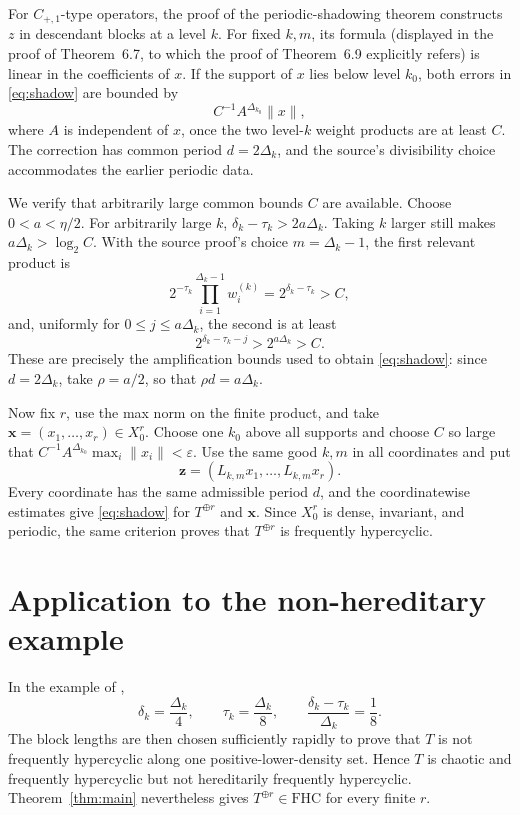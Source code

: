 \documentclass[11pt]{article}
\newcommand{\FHC}{\mathrm{FHC}}
\begin{document}
For \(C_{+,1}\)-type operators, the proof of the periodic-shadowing theorem
constructs \(z\) in descendant blocks at a level \(k\).  For fixed \(k,m\),
its formula (displayed in the proof of Theorem~6.7, to which the proof of
Theorem~6.9 explicitly refers) is linear in the coefficients of \(x\).  If
the support of \(x\)
lies below level \(k_0\), both errors in \eqref{eq:shadow} are bounded by
\[
 C^{-1}A^{\Delta_{k_0}}\|x\|,
\]
where \(A\) is independent of \(x\), once the two level-\(k\) weight products
are at least \(C\).  The correction has common period \(d=2\Delta_k\), and
the source's divisibility choice accommodates the earlier periodic data.

We verify that arbitrarily large common bounds \(C\) are available.  Choose
\(0<a<\eta/2\).  For arbitrarily large \(k\),
\(\delta_k-\tau_k>2a\Delta_k\).  Taking \(k\) larger still makes
\(a\Delta_k>\log_2 C\).  With the source proof's choice \(m=\Delta_k-1\),
the first relevant product is
\[
 2^{-\tau_k}\prod_{i=1}^{\Delta_k-1}w_i^{(k)}
 =2^{\delta_k-\tau_k}>C,
\]
and, uniformly for \(0\le j\le a\Delta_k\), the second is at least
\[
 2^{\delta_k-\tau_k-j}>2^{a\Delta_k}>C.
\]
These are precisely the amplification bounds used to obtain
\eqref{eq:shadow}: since \(d=2\Delta_k\), take \(\rho=a/2\), so that
\(\rho d=a\Delta_k\).

Now fix \(r\), use the max norm on the finite product, and take
\(\mathbf x=(x_1,\ldots,x_r)\in X_0^r\).  Choose one \(k_0\) above all
supports and choose \(C\) so large that
\(C^{-1}A^{\Delta_{k_0}}\max_i\|x_i\|<\varepsilon\).
Use the same good \(k,m\) in all coordinates and put
\[
 \mathbf z=(L_{k,m}x_1,\ldots,L_{k,m}x_r).
\]
Every coordinate has the same admissible period \(d\), and the coordinatewise
estimates give \eqref{eq:shadow} for \(T^{\oplus r}\) and
\(\mathbf x\).  Since \(X_0^r\) is dense, invariant, and periodic, the same
criterion proves that \(T^{\oplus r}\) is frequently hypercyclic.

\section*{Application to the non-hereditary example}
In the example of \cite{hfhc},
\[
 \delta_k=\frac{\Delta_k}{4},
 \qquad
 \tau_k=\frac{\Delta_k}{8},
 \qquad
 \frac{\delta_k-\tau_k}{\Delta_k}=\frac18.
\]
The block lengths are then chosen sufficiently rapidly to prove that \(T\)
is not frequently hypercyclic along one positive-lower-density set.  Hence
\(T\) is chaotic and frequently hypercyclic but not hereditarily frequently
hypercyclic.  Theorem~\ref{thm:main} nevertheless gives
\(T^{\oplus r}\in\FHC\) for every finite \(r\).
\end{document}
